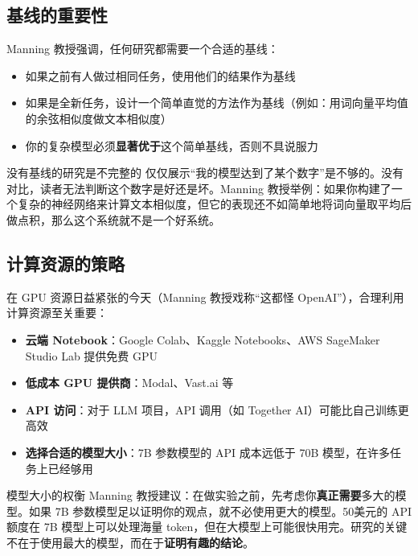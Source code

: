 \documentclass[a4paper]{article}
\begin{document}
\subsection{基线的重要性}

Manning 教授强调，任何研究都需要一个合适的基线：

\begin{itemize}
    \item 如果之前有人做过相同任务，使用他们的结果作为基线
    \item 如果是全新任务，设计一个简单直觉的方法作为基线（例如：用词向量平均值的余弦相似度做文本相似度）
    \item 你的复杂模型必须\textbf{显著优于}这个简单基线，否则不具说服力
\end{itemize}

\begin{warningbox}{没有基线的研究是不完整的}
仅仅展示``我的模型达到了某个数字''是不够的。没有对比，读者无法判断这个数字是好还是坏。Manning 教授举例：如果你构建了一个复杂的神经网络来计算文本相似度，但它的表现还不如简单地将词向量取平均后做点积，那么这个系统就不是一个好系统。
\end{warningbox}

\subsection{计算资源的策略}

在 GPU 资源日益紧张的今天（Manning 教授戏称``这都怪 OpenAI''），合理利用计算资源至关重要：

\begin{itemize}
    \item \textbf{云端 Notebook}：Google Colab、Kaggle Notebooks、AWS SageMaker Studio Lab 提供免费 GPU
    \item \textbf{低成本 GPU 提供商}：Modal、Vast.ai 等
    \item \textbf{API 访问}：对于 LLM 项目，API 调用（如 Together AI）可能比自己训练更高效
    \item \textbf{选择合适的模型大小}：7B 参数模型的 API 成本远低于 70B 模型，在许多任务上已经够用
\end{itemize}

\begin{knowledgebox}{模型大小的权衡}
Manning 教授建议：在做实验之前，先考虑你\textbf{真正需要}多大的模型。如果 7B 参数模型足以证明你的观点，就不必使用更大的模型。50美元的 API 额度在 7B 模型上可以处理海量 token，但在大模型上可能很快用完。研究的关键不在于使用最大的模型，而在于\textbf{证明有趣的结论}。
\end{knowledgebox}
\end{document}
